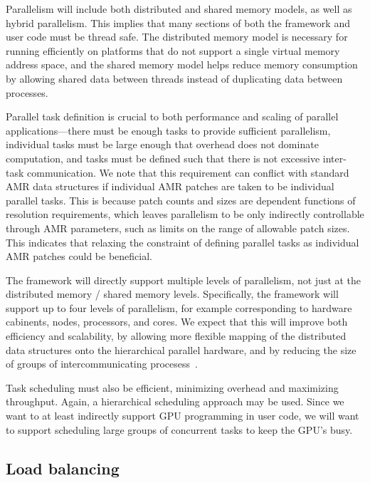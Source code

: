 \documentclass[10pt,twocolumn]{article}
\begin{document}
Parallelism will include both distributed and shared memory models, as
well as hybrid parallelism.  This implies that many sections of both
the framework and user code must be thread safe.  The distributed
memory model is necessary for running efficiently on platforms that do
not support a single virtual memory address space, and the shared
memory model helps reduce memory consumption by allowing shared data
between threads instead of duplicating data between processes.

Parallel task definition is crucial to both performance and scaling of
parallel applications---there must be enough tasks to provide
sufficient parallelism, individual tasks must be large enough that
overhead does not dominate computation, and tasks must be defined such
that there is not excessive inter-task communication.  We note that
this requirement can conflict with standard AMR data structures if
individual AMR patches are taken to be individual parallel tasks.
This is because patch counts and sizes are dependent functions of
resolution requirements, which leaves parallelism to be only
indirectly controllable through AMR parameters, such as limits on the
range of allowable patch sizes.  This indicates that relaxing the
constraint of defining parallel tasks as individual AMR patches could
be beneficial.

The framework will directly support multiple levels of parallelism,
not just at the distributed memory / shared memory levels.
Specifically, the framework will support up to four levels of
parallelism, for example corresponding to hardware cabinents, nodes,
processors, and cores.  We expect that this will improve both
efficiency and scalability, by allowing more flexible mapping of the
distributed data structures onto the hierarchical parallel hardware,
and by reducing the size of groups of intercommunicating
procesess~\cite{BaBu09}.

Task scheduling must also be efficient, minimizing overhead and
maximizing throughput.  Again, a hierarchical scheduling approach may
be used.  Since we want to at least indirectly support GPU programming
in user code, we will want to support scheduling large groups of
concurrent tasks to keep the GPU's busy.

\subsection{Load balancing} \label{ss:require-balance}
\end{document}
